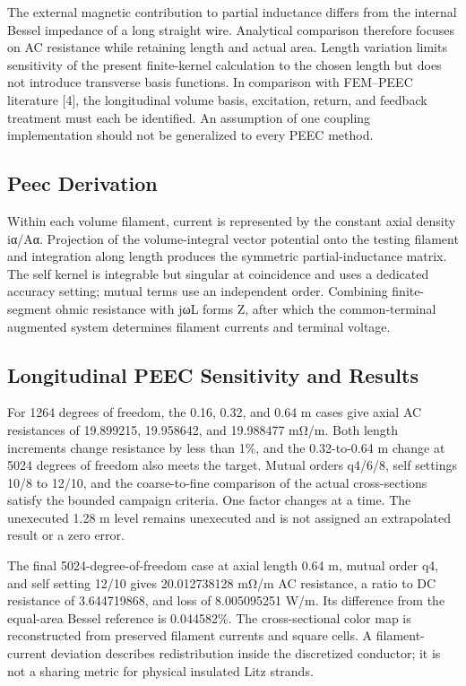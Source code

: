 \documentclass[journal,10pt]{IEEEtran}
\begin{document}
The external magnetic contribution to partial inductance differs from the internal Bessel impedance of a long straight wire. Analytical comparison therefore focuses on AC resistance while retaining length and actual area. Length variation limits sensitivity of the present finite-kernel calculation to the chosen length but does not introduce transverse basis functions. In comparison with FEM–PEEC literature [4], the longitudinal volume basis, excitation, return, and feedback treatment must each be identified. An assumption of one coupling implementation should not be generalized to every PEEC method.


\subsection*{Peec Derivation}
\hypertarget{06.peec_derivation.heading}{}
Within each volume filament, current is represented by the constant axial density iα/Aα. Projection of the volume-integral vector potential onto the testing filament and integration along length produces the symmetric partial-inductance matrix. The self kernel is integrable but singular at coincidence and uses a dedicated accuracy setting; mutual terms use an independent order. Combining finite-segment ohmic resistance with jωL forms Z, after which the common-terminal augmented system determines filament currents and terminal voltage.


\subsection*{Longitudinal PEEC Sensitivity and Results}
\hypertarget{06.peec_results.heading}{}
For 1264 degrees of freedom, the 0.16, 0.32, and 0.64 m cases give axial AC resistances of 19.899215, 19.958642, and 19.988477 mΩ/m. Both length increments change resistance by less than 1\%, and the 0.32-to-0.64 m change at 5024 degrees of freedom also meets the target. Mutual orders q4/6/8, self settings 10/8 to 12/10, and the coarse-to-fine comparison of the actual cross-sections satisfy the bounded campaign criteria. One factor changes at a time. The unexecuted 1.28 m level remains unexecuted and is not assigned an extrapolated result or a zero error.


The final 5024-degree-of-freedom case at axial length 0.64 m, mutual order q4, and self setting 12/10 gives 20.012738128 mΩ/m AC resistance, a ratio to DC resistance of 3.644719868, and loss of 8.005095251 W/m. Its difference from the equal-area Bessel reference is 0.044582\%. The cross-sectional color map is reconstructed from preserved filament currents and square cells. A filament-current deviation describes redistribution inside the discretized conductor; it is not a sharing metric for physical insulated Litz strands.
\end{document}
